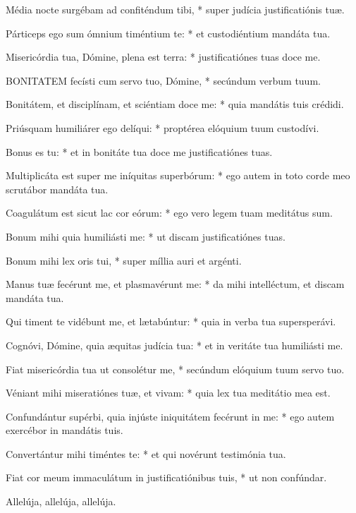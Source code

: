 Média nocte surgébam ad confiténdum tibi, * super judícia justificatiónis tuæ.

Párticeps ego sum ómnium timéntium te: * et custodiéntium mandáta tua.

Misericórdia tua, Dómine, plena est terra: * justificatiónes tuas doce me.


\lettrine[lines=2]{B}{ONITATEM} fecísti cum servo tuo, Dómine, * secúndum verbum tuum.

Bonitátem, et disciplínam, et sciéntiam doce me: * quia mandátis tuis crédidi.

Priúsquam humiliárer ego delíqui: * proptérea elóquium tuum custodívi.

Bonus es tu: * et in bonitáte tua doce me justificatiónes tuas.

Multiplicáta est super me iníquitas superbórum: * ego autem in toto corde meo scrutábor mandáta tua.

Coagulátum est sicut lac cor eórum: * ego vero legem tuam meditátus sum.

Bonum mihi quia humiliásti me: * ut discam justificatiónes tuas.

Bonum mihi lex oris tui, * super míllia auri et argénti.

Manus tuæ fecérunt me, et plasmavérunt me: * da mihi intelléctum, et discam mandáta tua.

Qui timent te vidébunt me, et lætabúntur: * quia in verba tua supersperávi.

Cognóvi, Dómine, quia æquitas judícia tua: * et in veritáte tua humiliásti me.

Fiat misericórdia tua ut consolétur me, * secúndum elóquium tuum servo tuo.

Véniant mihi miseratiónes tuæ, et vivam: * quia lex tua meditátio mea est.

Confundántur supérbi, quia injúste iniquitátem fecérunt in me: * ego autem exercébor in mandátis tuis.

Convertántur mihi timéntes te: * et qui novérunt testimónia tua.

Fiat cor meum immaculátum in justificatiónibus tuis, * ut non confúndar.



 Allelúja, allelúja, allelúja.


